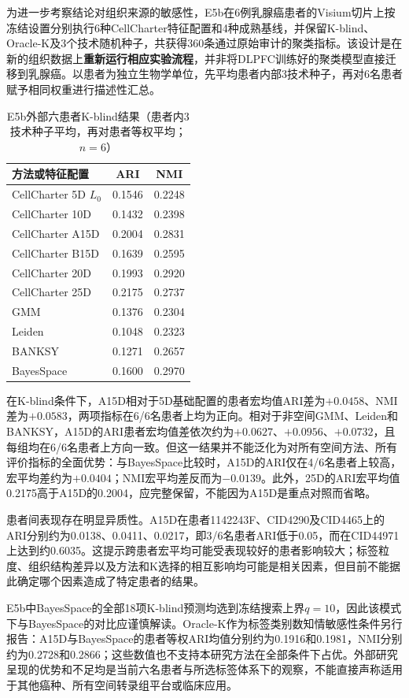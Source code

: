 为进一步考察结论对组织来源的敏感性，E5b在6例乳腺癌患者的Visium切片上按冻结设置分别执行6种CellCharter特征配置和4种成熟基线，并保留K-blind、Oracle-K及3个技术随机种子，共获得360条通过原始审计的聚类指标。该设计是在新的组织数据上\textbf{重新运行相应实验流程}，并非将DLPFC训练好的聚类模型直接迁移到乳腺癌。以患者为独立生物学单位，先平均患者内部3技术种子，再对6名患者赋予相同权重进行描述性汇总。

\begin{table}[htbp]
\centering
\caption{E5b外部六患者K-blind结果（患者内3技术种子平均，再对患者等权平均；$n=6$）}
\label{tab:cellcharter-e5b-v1}
\begin{tabular}{lcc}
\toprule
方法或特征配置 & ARI & NMI\\
\midrule
CellCharter 5D $L_0$ & 0.1546 & 0.2248\\
CellCharter 10D & 0.1432 & 0.2398\\
CellCharter A15D & 0.2004 & 0.2831\\
CellCharter B15D & 0.1639 & 0.2595\\
CellCharter 20D & 0.1993 & 0.2920\\
CellCharter 25D & 0.2175 & 0.2737\\
GMM & 0.1376 & 0.2304\\
Leiden & 0.1048 & 0.2323\\
BANKSY & 0.1271 & 0.2657\\
BayesSpace & 0.1600 & 0.2970\\
\bottomrule
\end{tabular}
\end{table}

在K-blind条件下，A15D相对于5D基础配置的患者宏均值ARI差为$+0.0458$、NMI差为$+0.0583$，两项指标在6/6名患者上均为正向。相对于非空间GMM、Leiden和BANKSY，A15D的ARI患者宏均值差依次约为$+0.0627$、$+0.0956$、$+0.0732$，且每组均在6/6名患者上方向一致。但这一结果并不能泛化为对所有空间方法、所有评价指标的全面优势：与BayesSpace比较时，A15D的ARI仅在4/6名患者上较高，宏平均差约为$+0.0404$；NMI宏平均差反而为$-0.0139$。此外，25D的ARI宏平均值0.2175高于A15D的0.2004，应完整保留，不能因为A15D是重点对照而省略。

患者间表现存在明显异质性。A15D在患者1142243F、CID4290及CID4465上的ARI分别约为0.0138、0.0411、0.0217，即3/6名患者ARI低于0.05，而在CID44971上达到约0.6035。这提示跨患者宏平均可能受表现较好的患者影响较大；标签粒度、组织结构差异以及方法和K选择的相互影响均可能是相关因素，但目前不能据此确定哪个因素造成了特定患者的结果。

E5b中BayesSpace的全部18项K-blind预测均选到冻结搜索上界$q=10$，因此该模式下与BayesSpace的对比应谨慎解读。Oracle-K作为标签类别数知情敏感性条件另行报告：A15D与BayesSpace的患者等权ARI均值分别约为0.1916和0.1981，NMI分别约为0.2728和0.2866；这些数值也不支持本研究方法在全部条件下占优。外部研究呈现的优势和不足均是当前六名患者与所选标签体系下的观察，不能直接声称适用于其他癌种、所有空间转录组平台或临床应用。

